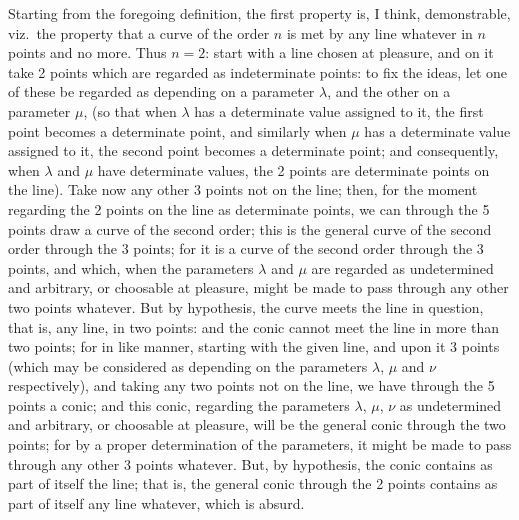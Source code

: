 \documentclass[11pt,a4paper]{article}
\begin{document}
Starting from the foregoing definition, the first property is, I think, demonstrable, viz.\ the property that a curve of the order $n$ is met by any line whatever in $n$ points and no more. Thus $n = 2$: start with a line chosen at pleasure, and on it take 2 points which are regarded as indeterminate points: to fix the ideas, let one of these be regarded as depending on a parameter $\lambda$, and the other on a parameter $\mu$, (so that when $\lambda$ has a determinate value assigned to it, the first point becomes a determinate point, and similarly when $\mu$ has a determinate value assigned to it, the second point becomes a determinate point; and consequently, when $\lambda$ and $\mu$ have determinate values, the 2 points are determinate points on the line). Take now any other 3 points not on the line; then, for the moment regarding the 2 points on the line as determinate points, we can through the 5 points draw a curve of the second order; this is the general curve of the second order through the 3 points; for it is a curve of the second order through the 3 points, and which, when the parameters $\lambda$ and $\mu$ are regarded as undetermined and arbitrary, or choosable at pleasure, might be made to pass through any other two points whatever. But by hypothesis, the curve meets the line in question, that is, any line, in two points: and the conic cannot meet the line in more than two points; for in like manner, starting with the given line, and upon it 3 points (which may be considered as depending on the parameters $\lambda$, $\mu$ and $\nu$ respectively), and taking any two points not on the line, we have through the 5 points a conic; and this conic, regarding the parameters $\lambda$, $\mu$, $\nu$ as undetermined and arbitrary, or choosable at pleasure, will be the general conic through the two points; for by a proper determination of the parameters, it might be made to pass through any other 3 points whatever. But, by hypothesis, the conic contains as part of itself the line; that is, the general conic through the 2 points contains as part of itself any line whatever, which is absurd.
\end{document}
